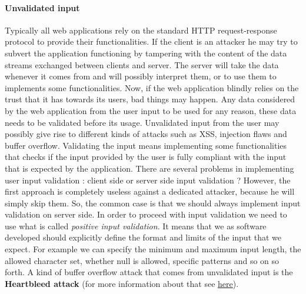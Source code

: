 \paragraph{Unvalidated input} Typically all web applications rely on the standard HTTP request-response protocol to provide their functionalities. If the client is an attacker he may try to subvert the application functioning by tampering with the content of the data streams exchanged between clients and server. The server will take the data whenever it comes from and will possibly interpret them, or to use them to implements some functionalities. Now, if the web application blindly relies on the trust that it has towards its users, bad things may happen. Any data considered by the web application from the user input to be used for any reason, these data needs to be validated before its usage. Unvalidated input from the user may possibly give rise to different kinds of attacks such as XSS, injection flaws and buffer overflow. Validating the input means implementing some functionalities that checks if the input provided by the user is fully compliant with the input that is expected by the application. There are several problems in implementing user input validation : client side or server side input validation ? However, the first approach is completely useless against a dedicated attacker, because he will simply skip them. So, the common case is that we should always implement input validation on server side. In order to proceed with input validation we need to use what is called \textit{positive input validation}. It means that we as software developed should explicitly define the format and limits of the input that we expect. For example we can specify the minimum and maximum input length, the allowed character set, whether null is allowed, specific patterns and so on so forth. A kind of buffer overflow attack that comes from unvalidated input is the \textbf{Heartbleed attack} (for more information about that see \href{https://www.vox.com/2014/6/19/18076318/heartbleed}{here}). 

